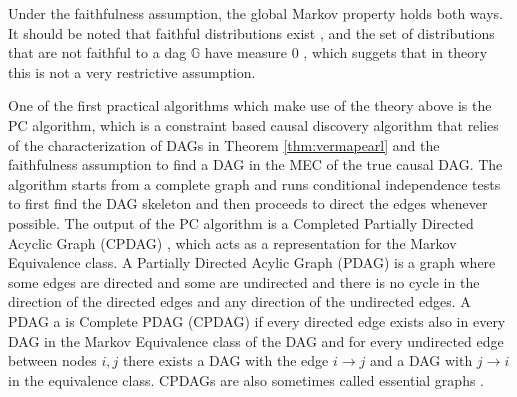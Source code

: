 \documentclass{tufte-book}
\begin{document}
Under the faithfulness assumption, the global Markov property holds both ways. It should be noted that faithful distributions exist \cite{meek-2013-stron-compl}, and the set of distributions that are not faithful to a dag \(\mathbb{G}\) have measure \(0\) \cite{uhler-2013-geomet-faith}, which suggets that in theory this is not a very restrictive assumption.



One of the first practical algorithms which make use of the theory above is the PC algorithm, \cite{spirtes-2000-causation-prediction-search,kalisch-2007-estim-high} which is a constraint based causal discovery algorithm that relies of the characterization of DAGs in Theorem \ref{thm:vermapearl} and the faithfulness assumption to find a DAG in the MEC of the true causal DAG. The algorithm starts from a complete graph and runs conditional independence tests to first find the DAG skeleton and then proceeds to direct the edges whenever possible. The output of the PC algorithm is a Completed Partially Directed Acyclic Graph (CPDAG) \cite{meek-2013-causal-infer}, which acts as a representation for the Markov Equivalence class. A Partially Directed Acylic Graph (PDAG) is a graph where some edges are directed and some are undirected and there is no cycle in the direction of the directed edges and any direction of the undirected edges. A PDAG a is Complete PDAG (CPDAG) if every directed edge exists also in every DAG in the Markov Equivalence class of the DAG and for every undirected edge between nodes \(i,j\) there exists a DAG with the edge \(i \rightarrow j\) and a DAG with \(j \rightarrow i\) in the equivalence class. CPDAGs are also sometimes called essential graphs \cite{andersson-1997-charac-markov}.
\end{document}

